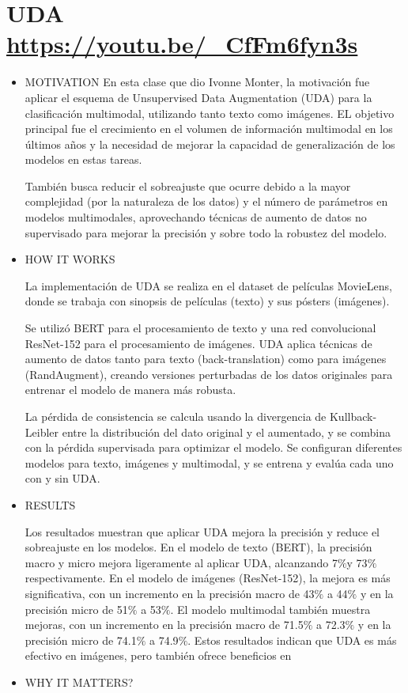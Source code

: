 \documentclass[letter, 11pt, twoside]{report}
\begin{document}
\section*{UDA \color{mirosa}\url{https://youtu.be/_CfFm6fyn3s}}
\begin{itemize}
    \item MOTIVATION
    En esta clase que dio Ivonne Monter, la motivación fue aplicar el esquema de Unsupervised Data Augmentation (UDA) para la clasificación multimodal, utilizando tanto texto como imágenes. EL objetivo principal fue el crecimiento en el volumen de información multimodal en los últimos años y la necesidad de mejorar la capacidad de generalización de los modelos en estas tareas. 
    
    También busca reducir el sobreajuste que ocurre debido a la mayor complejidad (por la naturaleza de los datos) y el número de parámetros en modelos multimodales, aprovechando técnicas de aumento de datos no supervisado para mejorar la precisión y sobre todo la robustez del modelo.
    
    \item HOW IT WORKS
    
    La implementación de UDA se realiza en el dataset de películas MovieLens, donde se trabaja con sinopsis de películas (texto) y sus pósters (imágenes). 
    
    Se utilizó BERT para el procesamiento de texto y una red convolucional ResNet-152 para el procesamiento de imágenes. UDA aplica técnicas de aumento de datos tanto para texto (back-translation) como para imágenes (RandAugment), creando versiones perturbadas de los datos originales para entrenar el modelo de manera más robusta. 
    
    La pérdida de consistencia se calcula usando la divergencia de Kullback-Leibler entre la distribución del dato original y el aumentado, y se combina con la pérdida supervisada para optimizar el modelo. Se configuran diferentes modelos para texto, imágenes y multimodal, y se entrena y evalúa cada uno con y sin UDA.
    \item RESULTS
    
    Los resultados muestran que aplicar UDA mejora la precisión y reduce el sobreajuste en los modelos. En el modelo de texto (BERT), la precisión macro y micro mejora ligeramente al aplicar UDA, alcanzando 7$\%$y 73$\%$ respectivamente. En el modelo de imágenes (ResNet-152), la mejora es más significativa, con un incremento en la precisión macro de 43$\%$ a 44$\%$ y en la precisión micro de 51$\%$ a 53$\%$. El modelo multimodal también muestra mejoras, con un incremento en la precisión macro de 71.5$\%$ a 72.3$\%$ y en la precisión micro de 74.1$\%$ a 74.9$\%$. Estos resultados indican que UDA es más efectivo en imágenes, pero también ofrece beneficios en
    \item WHY IT MATTERS?
    

\end{itemize}
\end{document}
